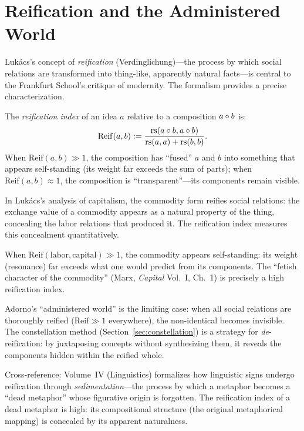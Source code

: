 \section{Reification and the Administered World}
\label{sec:reification}

Luk\'acs's concept of \emph{reification} (Verdinglichung)---the process by
which social relations are transformed into thing-like, apparently natural
facts---is central to the Frankfurt School's critique of modernity. The
formalism provides a precise characterization.

\begin{definition}
\label{def:reification-index}
The \emph{reification index} of an idea $a$ relative to a composition
$a \circ b$ is:
\[
\mathrm{Reif}(a, b) := \frac{\mathrm{rs}(a \circ b, a \circ b)}{\mathrm{rs}(a, a) + \mathrm{rs}(b, b)}.
\]
When $\mathrm{Reif}(a,b) \gg 1$, the composition has ``fused'' $a$ and $b$
into something that appears self-standing (its weight far exceeds the sum of
parts); when $\mathrm{Reif}(a,b) \approx 1$, the composition is
``transparent''---its components remain visible.
\end{definition}

\begin{interpretation}
In Luk\'acs's analysis of capitalism, the commodity form reifies social
relations: the exchange value of a commodity appears as a natural property
of the thing, concealing the labor relations that produced it. The
reification index measures this concealment quantitatively.

When $\mathrm{Reif}(\text{labor}, \text{capital}) \gg 1$, the commodity
appears self-standing: its weight (resonance) far exceeds what one would
predict from its components. The ``fetish character of the commodity'' (Marx,
\textit{Capital} Vol.~I, Ch.~1) is precisely a high reification index.

Adorno's ``administered world'' is the limiting case: when all social relations
are thoroughly reified ($\mathrm{Reif} \gg 1$ everywhere), the non-identical
becomes invisible. The constellation method (Section~\ref{sec:constellation})
is a strategy for \emph{de}-reification: by juxtaposing concepts without
synthesizing them, it reveals the components hidden within the reified whole.

Cross-reference: Volume~IV (Linguistics) formalizes how linguistic signs
undergo reification through \emph{sedimentation}---the process by which
a metaphor becomes a ``dead metaphor'' whose figurative origin is forgotten.
The reification index of a dead metaphor is high: its compositional structure
(the original metaphorical mapping) is concealed by its apparent naturalness.
\end{interpretation}

